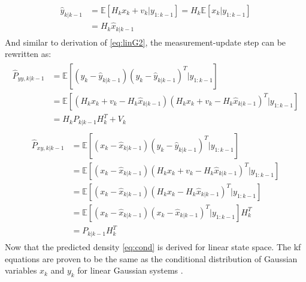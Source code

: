 \documentclass[12pt]{article}
\begin{document}
\begin{enumerate}[label=\arabic*)]
        \begin{align} \label{eq:linG3}
        \begin{split}
            \hat y_{k|k-1} &=  \mathbb E[ H_{k} x_{k} + v_{k} |y_{1:k-1}] = H_{k} \mathbb E[ x_{k} |y_{1:k-1}] \\
            &= H_{k} \hat x_{k|k-1}
        \end{split}
        \end{align}
        And similar to derivation of \eqref{eq:linG2}, the measurement-update step can be rewritten as:
        \begin{align} \label{eq:linG4}
        \begin{split}
            \hat P_{yy,k|k-1} &=  \mathbb E[(y_k-\hat y_{k|k-1})(y_k-\hat y_{k|k-1})^T|y_{1:k-1}] \\
            &= \mathbb E[ ( H_{k} x_{k} + v_{k}- H_{k} \hat x_{k|k-1})( H_{k} x_{k} + v_{k}- H_{k} \hat x_{k|k-1})^T|y_{1:k-1}] \\
            &= H_{k} P_{k|k-1} H^T_{k} + V_{k}
        \end{split}
        \end{align}
        \begin{align} \label{eq:linG5}
        \begin{split}
            \hat P_{xy,k|k-1} &= \mathbb E[(x_k-\hat x_{k|k-1})(y_k-\hat y_{k|k-1})^T|y_{1:k-1}]  \\
            &=  \mathbb E[(x_k-\hat x_{k|k-1})( H_{k} x_{k} + v_{k}- H_{k} \hat x_{k|k-1})^T |y_{1:k-1}]   \\
            &=  \mathbb E[(x_k-\hat x_{k|k-1})( H_{k} x_{k} - H_{k} \hat x_{k|k-1})^T |y_{1:k-1}]  \\
            &= \mathbb E[(x_k-\hat x_{k|k-1})( x_{k} - \hat x_{k|k-1})^T |y_{1:k-1}] H^T_{k}  \\
            &= P_{k|k-1} H^T_{k} 
        \end{split}
        \end{align}
        Now that the predicted density \eqref{eq:cond} is derived for linear state space. The \acrshort{kf} equations are proven to be the same as the conditional distribution of Gaussian variables $x_k$ and $y_k$ for linear Gaussian systems \cite{sarkka2013bayesian}.
        

\end{enumerate}
\end{document}
